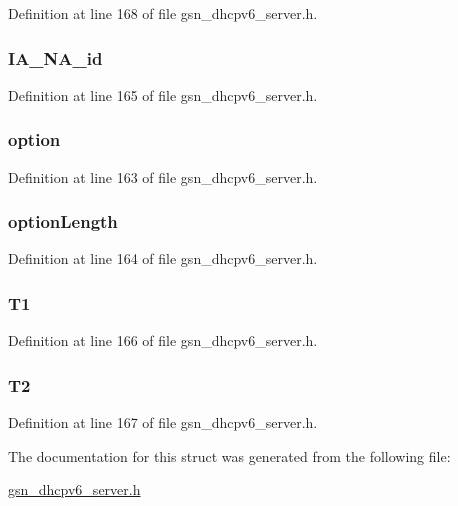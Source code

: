 Definition at line 168 of file gsn\_\-dhcpv6\_\-server.h.

\hypertarget{a00012_a20eae1f6e8c86f9c187b44aa162e9d29}{
\subsubsection[{IA\_\-NA\_\-id}]{ {\bf IA\_\-NA\_\-id}}}
\label{a00012_a20eae1f6e8c86f9c187b44aa162e9d29}


Definition at line 165 of file gsn\_\-dhcpv6\_\-server.h.

\hypertarget{a00012_a4ea9b0ff2f7afc39a9ce6e27efea3c1a}{
\subsubsection[{option}]{ {\bf option}}}
\label{a00012_a4ea9b0ff2f7afc39a9ce6e27efea3c1a}


Definition at line 163 of file gsn\_\-dhcpv6\_\-server.h.

\hypertarget{a00012_a34af08bbd90310de2d99728fb4bc5aee}{
\subsubsection[{optionLength}]{ {\bf optionLength}}}
\label{a00012_a34af08bbd90310de2d99728fb4bc5aee}


Definition at line 164 of file gsn\_\-dhcpv6\_\-server.h.

\hypertarget{a00012_abddb72aaa9095129e618bd0621412ab3}{
\subsubsection[{T1}]{ {\bf T1}}}
\label{a00012_abddb72aaa9095129e618bd0621412ab3}


Definition at line 166 of file gsn\_\-dhcpv6\_\-server.h.

\hypertarget{a00012_ae2a551175ad9eef4bcf84ee25773c78b}{
\subsubsection[{T2}]{ {\bf T2}}}
\label{a00012_ae2a551175ad9eef4bcf84ee25773c78b}


Definition at line 167 of file gsn\_\-dhcpv6\_\-server.h.



The documentation for this struct was generated from the following file:\begin{DoxyCompactItemize}
\item 
\hyperlink{a00483}{gsn\_\-dhcpv6\_\-server.h}\end{DoxyCompactItemize}
